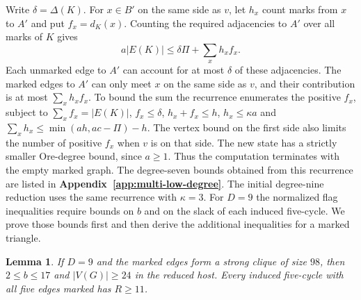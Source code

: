 \documentclass[preprint,11pt,numbers]{elsarticle-arxiv}
\numberwithin{equation}{section}
\newtheorem{lemma}[theorem]{Lemma}
\theoremstyle{definition}
\begin{document}
Write $\delta=\Delta(K)$. For $x\in B'$ on the same side
as $v$, let $h_x$ count marks from $x$ to $A'$ and put
$f_x=d_K(x)$. Counting the required adjacencies to $A'$
over all marks of $K$ gives
\[
 a|E(K)|\le\delta\Pi+\sum_x h_xf_x.
\]
Each unmarked edge to $A'$ can account for at most
$\delta$ of these adjacencies. The marked edges to $A'$
can only meet $x$ on the same side as $v$, and their
contribution is at most $\sum_x h_x f_x$. To bound the sum
the recurrence enumerates the positive $f_x$, subject to
$\sum_x f_x=|E(K)|$, $f_x\le\delta$, $h_x+f_x\le h$,
$h_x\le\kappa a$ and $\sum_x h_x\le\min(ah,ac-\Pi)-h$.
The vertex bound on the first side also limits the
number of positive $f_x$ when $v$ is on that side. The
new state has a strictly smaller Ore-degree bound, since $a\geq1$.
Thus the computation terminates with the empty marked graph.
The degree-seven bounds obtained from this recurrence are listed
in \textbf{Appendix~\ref{app:multi-low-degree}}. The initial degree-nine
reduction uses the same recurrence with $\kappa=3$.
For $D=9$ the normalized flag inequalities require bounds on $b$
and on the slack of each induced five-cycle. We prove those bounds
first and then derive the additional inequalities for a marked triangle.

\begin{lemma}\label{lem:finite-nine}
If $D=9$ and the marked edges form a strong clique of size $98$, then
$2\leq b\leq17$ and $|V(G)|\geq24$ in the reduced host. Every induced
five-cycle with all five edges marked has $R\geq11$.
\end{lemma}
\end{document}
